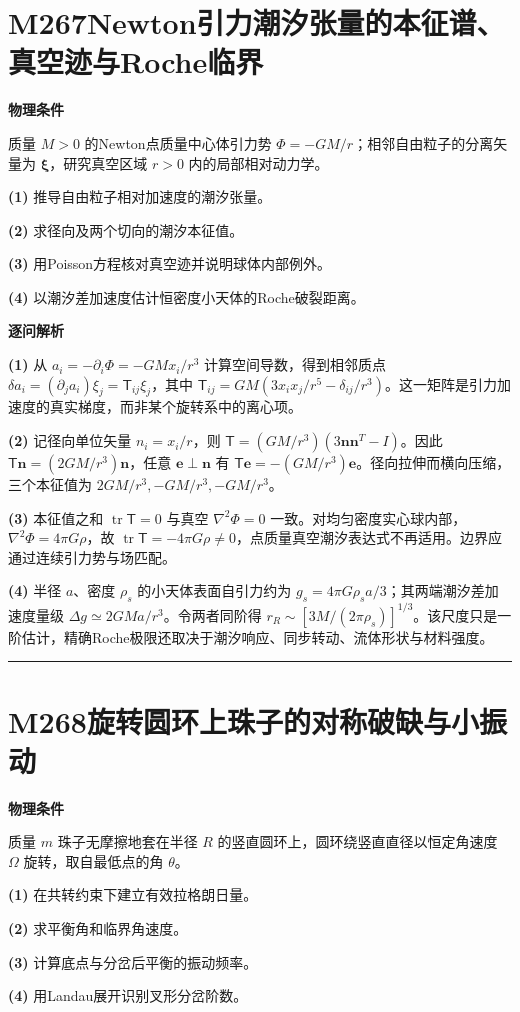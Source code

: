 \documentclass[UTF8,a4paper,11pt,oneside,openany]{ctexbook}
\begin{document}
\section*{M267\quad Newton引力潮汐张量的本征谱、真空迹与Roche临界}
\textbf{物理条件}\par 质量 \(M>0\) 的Newton点质量中心体引力势 \(\Phi=-GM/r\)；相邻自由粒子的分离矢量为 \(\boldsymbol\xi\)，研究真空区域 \(r>0\) 内的局部相对动力学。
\par\noindent\textbf{(1)} 推导自由粒子相对加速度的潮汐张量。
\par\noindent\textbf{(2)} 求径向及两个切向的潮汐本征值。
\par\noindent\textbf{(3)} 用Poisson方程核对真空迹并说明球体内部例外。
\par\noindent\textbf{(4)} 以潮汐差加速度估计恒密度小天体的Roche破裂距离。

\par\medskip\noindent\textbf{逐问解析}
\par\noindent\textbf{(1)} 从 \(a_i=-\partial_i\Phi=-GMx_i/r^3\) 计算空间导数，得到相邻质点 \(\delta a_i=(\partial_ja_i)\xi_j=\mathsf T_{ij}\xi_j\)，其中 \(\mathsf T_{ij}=GM(3x_ix_j/r^5-\delta_{ij}/r^3)\)。这一矩阵是引力加速度的真实梯度，而非某个旋转系中的离心项。
\par\noindent\textbf{(2)} 记径向单位矢量 \(n_i=x_i/r\)，则 \(\mathsf T=(GM/r^3)(3\boldsymbol n\boldsymbol n^T-I)\)。因此 \(\mathsf T\boldsymbol n=(2GM/r^3)\boldsymbol n\)，任意 \(\boldsymbol e\perp\boldsymbol n\) 有 \(\mathsf T\boldsymbol e=-(GM/r^3)\boldsymbol e\)。径向拉伸而横向压缩，三个本征值为 \(2GM/r^3,-GM/r^3,-GM/r^3\)。
\par\noindent\textbf{(3)} 本征值之和 \(\operatorname{tr}\mathsf T=0\) 与真空 \(\nabla^2\Phi=0\) 一致。对均匀密度实心球内部，\(\nabla^2\Phi=4\pi G\rho\)，故 \(\operatorname{tr}\mathsf T=-4\pi G\rho\ne0\)，点质量真空潮汐表达式不再适用。边界应通过连续引力势与场匹配。
\par\noindent\textbf{(4)} 半径 \(a\)、密度 \(\rho_s\) 的小天体表面自引力约为 \(g_s=4\pi G\rho_s a/3\)；其两端潮汐差加速度量级 \(\Delta g\simeq2GM a/r^3\)。令两者同阶得 \(r_R\sim[3M/(2\pi\rho_s)]^{1/3}\)。该尺度只是一阶估计，精确Roche极限还取决于潮汐响应、同步转动、流体形状与材料强度。

\par\bigskip\hrule\bigskip
\section*{M268\quad 旋转圆环上珠子的对称破缺与小振动}
\textbf{物理条件}\par 质量 \(m\) 珠子无摩擦地套在半径 \(R\) 的竖直圆环上，圆环绕竖直直径以恒定角速度 \(\Omega\) 旋转，取自最低点的角 \(\theta\)。
\par\noindent\textbf{(1)} 在共转约束下建立有效拉格朗日量。
\par\noindent\textbf{(2)} 求平衡角和临界角速度。
\par\noindent\textbf{(3)} 计算底点与分岔后平衡的振动频率。
\par\noindent\textbf{(4)} 用Landau展开识别叉形分岔阶数。
\end{document}
